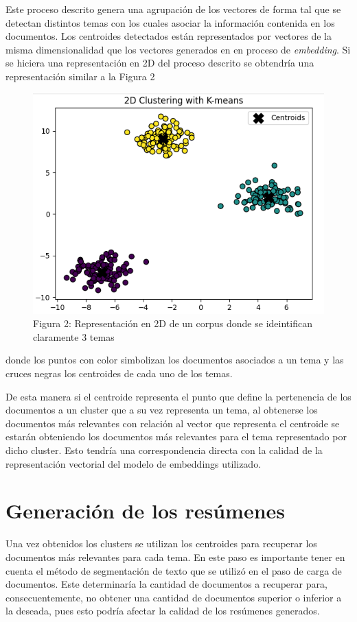     Este proceso descrito genera una agrupación de los vectores de forma tal que se detectan distintos temas con los cuales asociar la información contenida en los documentos. Los centroides detectados están representados por vectores de la misma dimensionalidad que los vectores generados en en proceso de \emph{embedding}. Si se hiciera una representación en 2D del proceso descrito se obtendría una representación similar a la Figura 2 
    \begin{figure}
        \centering
        \includegraphics[scale = 0.7]{Figures/clustering.png}
        \caption*{Figura 2: Representación en 2D de un corpus donde se ideintifican claramente 3 temas}
    \end{figure}
    donde los puntos con color simbolizan los documentos asociados a un tema  y las cruces negras los centroides de cada uno de los temas.

    De esta manera si el centroide representa el punto que define la pertenencia de los documentos a un cluster que a su vez representa un tema, al obtenerse los documentos más relevantes con relación al vector que representa el centroide se estarán obteniendo los documentos más relevantes para el tema representado por dicho cluster. Esto tendría una correspondencia directa con la calidad de la representación vectorial del modelo de embeddings utilizado.
\section{Generación de los resúmenes}
    Una vez obtenidos los clusters se utilizan los centroides para recuperar los documentos más relevantes para cada tema. En este paso es importante tener en cuenta el método de segmentación de texto que se utilizó en el paso de carga de documentos. Este determinaría la cantidad de documentos a recuperar para, consecuentemente, no obtener una cantidad de documentos superior o inferior a la deseada, pues esto podría afectar la calidad de los resúmenes generados.
    
